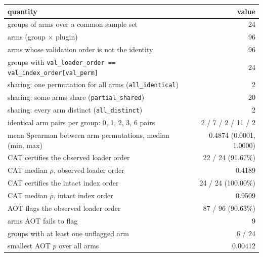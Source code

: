 \small
\begin{tabular}{lr}
\toprule
quantity & value \\
\midrule
groups of arms over a common sample set & 24 \\
arms (group $\times$ plugin) & 96 \\
arms whose validation order is not the identity & 96 \\
groups with \texttt{val\_loader\_order == val\_index\_order[val\_perm]} & 24 \\
sharing: one permutation for all arms (\texttt{all\_identical}) & 2 \\
sharing: some arms share (\texttt{partial\_shared}) & 20 \\
sharing: every arm distinct (\texttt{all\_distinct}) & 2 \\
identical arm pairs per group: 0, 1, 2, 3, 6 pairs & 2 / 7 / 2 / 11 / 2 \\
mean Spearman between arm permutations, median (min, max) & 0.4874 (0.0001, 1.0000) \\
CAT certifies the observed loader order & 22 / 24 (91.67\%) \\
CAT median $\bar{\rho}$, observed loader order & 0.4189 \\
CAT certifies the intact index order & 24 / 24 (100.00\%) \\
CAT median $\bar{\rho}$, intact index order & 0.9509 \\
AOT flags the observed loader order & 87 / 96 (90.63\%) \\
arms AOT fails to flag & 9 \\
groups with at least one unflagged arm & 6 / 24 \\
smallest AOT $p$ over all arms & 0.00412 \\
\bottomrule
\end{tabular}